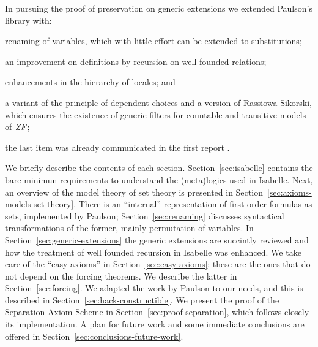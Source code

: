 

In pursuing the proof of preservation on generic extensions we
extended Paulson's library with:
\begin{inlinelist}
\item renaming of variables, which with little effort can be extended
  to substitutions;
\item an improvement on definitions by recursion on well-founded
  relations; 
\item enhancements in the hierarchy of locales; and
\item a variant of the  principle of dependent choices and a version
  of Rassiowa-Sikorski, which 
  ensures the existence of generic filters for countable and transitive
  models of $\mathit{ZF}$;
\end{inlinelist} 
the last item was already communicated in the
  first report \cite{2018arXiv180705174G}.
  
We briefly describe the contents of each
section. Section~\ref{sec:isabelle} contains the bare minimun
requirements to understand the (meta)logics used in Isabelle. Next, an
overview of the model theory of set theory is presented in
Section~\ref{sec:axioms-models-set-theory}. There is an ``internal''
representation of first-order formulas as sets, implemented by
Paulson; Section~\ref{sec:renaming} discusses syntactical
transformations of the former, mainly permutation of variables. 
In Section~\ref{sec:generic-extensions} the generic extensions are
succintly reviewed and how the treatment of well founded recursion in
Isabelle was enhanced. We take care of the ``easy axioms'' in
Section~\ref{sec:easy-axioms}; these are the ones that
do not depend on the forcing theorems. We describe the latter in
Section~\ref{sec:forcing}. We adapted the  work by Paulson to our
needs, and this is described in
Section~\ref{sec:hack-constructible}. We present the proof
of the Separation Axiom Scheme in Section~\ref{sec:proof-separation},
which follows closely its implementation. A plan for future work and
some immediate conclusions are offered in
Section~\ref{sec:conclusions-future-work}.

